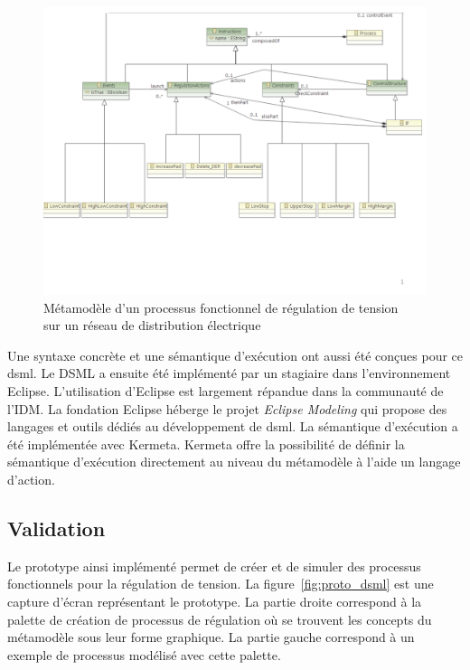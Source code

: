 \begin{figure}[!ht]
  \centering
  \includegraphics[trim = 0cm 5cm 0cm 0cm, clip, width=1\textwidth]{figures/6_methodologie/metamodele_dsml.pdf}
 \caption{Métamodèle d'un processus fonctionnel de régulation de tension \\
          sur un réseau de distribution électrique}
 \label{fig:meta_dsml}
\end{figure} 

Une syntaxe concrète et une sémantique d'exécution ont aussi été conçues pour ce
\gls{dsml}. Le DSML a ensuite été implémenté par un stagiaire dans
l'environnement Eclipse. L'utilisation d'Eclipse est largement répandue dans la
communauté de l'IDM. La fondation Eclipse héberge le projet \textit{Eclipse
Modeling} qui propose des langages et outils dédiés au développement de
\gls{dsml}. La sémantique d'exécution a été implémentée avec Kermeta. Kermeta
offre la possibilité de définir la sémantique d'exécution
directement au niveau du métamodèle à l'aide un langage d'action.


\subsection{Validation}
Le prototype ainsi implémenté permet de
créer et de simuler des processus fonctionnels pour la régulation de tension. La
figure~\ref{fig:proto_dsml} est une capture d'écran représentant le prototype. La
partie droite correspond à la palette de création de processus de régulation où
se trouvent les concepts du métamodèle sous leur forme graphique. La partie
gauche correspond à un exemple de processus modélisé avec cette palette.

